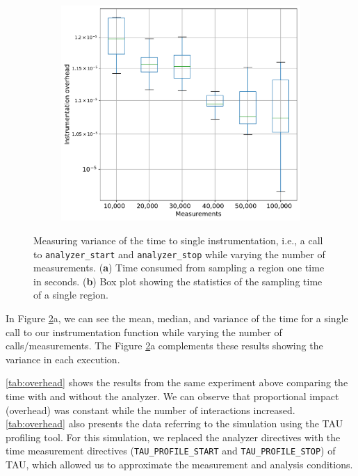 \begin{figure}[H]
\begin{subfigure}[b]{0.46\textwidth}
	\includegraphics[width=\textwidth]{pascalanalyzer/figures/designfeatures/instrumentation_overhead_boxplot.pdf}
	\label{fig:overhead_2}
\end{subfigure}
\caption{Measuring variance of the time to single instrumentation, 
	i.e., a call to {\tt analyzer\_start} and {\tt analyzer\_stop} while varying the number of measurements. (\textbf{a}) Time consumed from sampling a region one time in seconds. %
	(\textbf{b}) Box plot showing the statistics of the sampling time of a single region.}
\label{fig:overhead}
\end{figure}

In Figure \ref{fig:overhead}a, we can see the mean, median, and variance of the time for a single call to our instrumentation function while varying the number of calls/measurements. The Figure \ref{fig:overhead}a complements these results showing the variance in each execution. %

\cref{tab:overhead} shows the results from the same experiment above comparing the time with and without the analyzer. We can observe that proportional impact (overhead) was constant while the number of interactions increased. \cref{tab:overhead} also presents the data referring to the simulation using the TAU profiling tool. For this simulation, we replaced the analyzer directives with the time measurement directives ({\tt TAU\_PROFILE\_START} and {\tt TAU\_PROFILE\_STOP}) of TAU, which allowed us to approximate the measurement and analysis conditions. 

